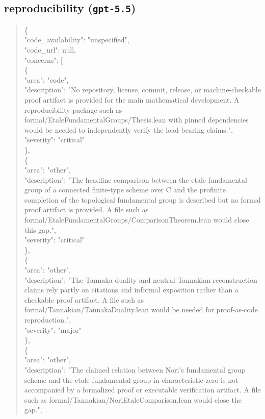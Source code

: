 \documentclass[11pt]{article}
\begin{document}
\subsection*{reproducibility (\texttt{gpt-5.5})}
\begin{quote}\small\ttfamily\raggedright
\{\\
  "code\_availability": "unspecified",\\
  "code\_url": null,\\
  "concerns": [\\
    \{\\
      "area": "code",\\
      "description": "No repository, license, commit, release, or machine-checkable proof artifact is provided for the main mathematical development. A reproducibility package such as formal/EtaleFundamentalGroups/Thesis.lean with pinned dependencies would be needed to independently verify the load-bearing claims.",\\
      "severity": "critical"\\
    \},\\
    \{\\
      "area": "other",\\
      "description": "The headline comparison between the etale fundamental group of a connected finite-type scheme over C and the profinite completion of the topological fundamental group is described but no formal proof artifact is provided. A file such as formal/EtaleFundamentalGroups/ComparisonTheorem.lean would close this gap.",\\
      "severity": "critical"\\
    \},\\
    \{\\
      "area": "other",\\
      "description": "The Tannaka duality and neutral Tannakian reconstruction claims rely partly on citations and informal exposition rather than a checkable proof artifact. A file such as formal/Tannakian/TannakaDuality.lean would be needed for proof-as-code reproduction.",\\
      "severity": "major"\\
    \},\\
    \{\\
      "area": "other",\\
      "description": "The claimed relation between Nori's fundamental group scheme and the etale fundamental group in characteristic zero is not accompanied by a formalized proof or executable verification artifact. A file such as formal/Tannakian/NoriEtaleComparison.lean would close the gap.",\\

\end{quote}
\end{document}
